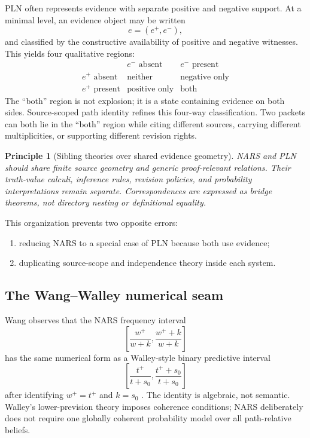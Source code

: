 \documentclass[11pt]{article}
\newtheorem{principle}[definition]{Principle}
\theoremstyle{remark}
\begin{document}
PLN often represents evidence with separate positive and negative support.
At a minimal level, an evidence object may be written
\[
  e=(e^+,e^-),
\]
and classified by the constructive availability of positive and negative
witnesses.  This yields four qualitative regions:
\[
  \begin{array}{c|c|c}
       & e^-\text{ absent} & e^-\text{ present}\\ \hline
    e^+\text{ absent}  & \text{neither} & \text{negative only}\\
    e^+\text{ present} & \text{positive only} & \text{both}
  \end{array}
\]
The ``both'' region is not explosion; it is a state containing evidence on
both sides.  Source-scoped path identity refines this four-way classification.
Two packets can both lie in the ``both'' region while citing different
sources, carrying different multiplicities, or supporting different revision
rights.

\begin{principle}[Sibling theories over shared evidence geometry]
NARS and PLN should share finite source geometry and generic proof-relevant
relations.  Their truth-value calculi, inference rules, revision policies, and
probability interpretations remain separate.  Correspondences are expressed
as bridge theorems, not directory nesting or definitional equality.
\end{principle}

This organization prevents two opposite errors:
\begin{enumerate}
  \item reducing NARS to a special case of PLN because both use evidence;
  \item duplicating source-scope and independence theory inside each system.
\end{enumerate}

\subsection{The Wang--Walley numerical seam}

Wang observes that the NARS frequency interval
\[
  \left[\frac{w^+}{w+k},\frac{w^++k}{w+k}\right]
\]
has the same numerical form as a Walley-style binary predictive interval
\[
  \left[\frac{t^+}{t+s_0},\frac{t^++s_0}{t+s_0}\right]
\]
after identifying $w^+=t^+$ and $k=s_0$ \cite{wang2009,walley1991}.
The identity is algebraic, not semantic.  Walley's lower-prevision theory
imposes coherence conditions; NARS deliberately does not require one globally
coherent probability model over all path-relative beliefs.
\end{document}
